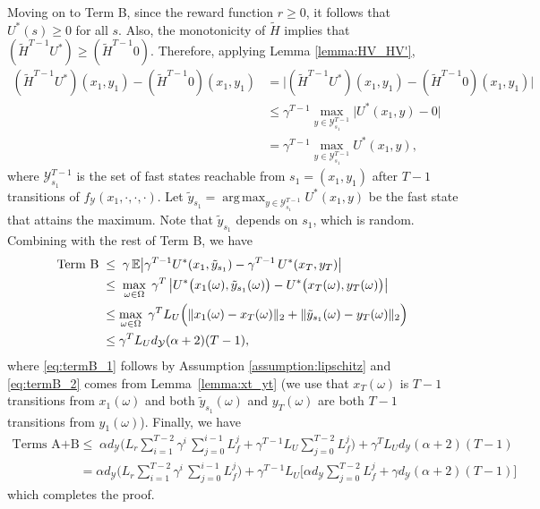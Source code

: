 \documentclass[11pt, notitlepage]{article}
\DeclareMathOperator*{\argmax}{arg\,max}
\newcommand{\E}{\mathbb{E}}
\newcommand{\1}{\mathbbm{1}}
\begin{document}
Moving on to Term B, since the reward function $r \ge 0$, it follows that $U^*(s) \ge 0$ for all $s$. Also, the monotonicity of $\tilde{H}$ implies that $(\tilde{H}^{T-1} U^*) \ge (\tilde{H}^{T-1} 0)$. Therefore, applying Lemma \ref{lemma:HV_HV'},
\begin{align*}
(\tilde{H}^{T-1} U^*)(x_1,y_1) - (\tilde{H}^{T-1} 0) (x_1,y_1) &= \bigl|(\tilde{H}^{T-1} U^*)(x_1,y_1) - (\tilde{H}^{T-1} 0) (x_1,y_1)\bigr|\\
&\le \gamma^{T-1} \textstyle \max_{y \in \mathcal Y_{s_1}^{T-1}} \bigl| U^*(x_1,y) - 0 \bigr| \\
&= \gamma^{T-1} \textstyle \max_{y \in \mathcal Y_{s_1}^{T-1}} U^*(x_1,y),
\end{align*}
where $\mathcal Y_{s_1}^{T-1}$ is the set of fast states reachable from $s_1=(x_1,y_1)$ after $T-1$ transitions of $f_\mathcal{Y}(x_1, \cdot, \cdot, \cdot)$. Let $\tilde{y}_{s_1} = \argmax_{y \in \mathcal Y_{s_1}^{T-1}} U^*(x_1,y)$ be the fast state that attains the maximum. Note that $\tilde{y}_{s_1}$ depends on $s_1$, which is random. Combining with the rest of Term B, we have
\begin{align}
\text{Term B} \; &\le \; \gamma \, \E  \bigl|\gamma^{T-1} U^*(x_1,\tilde{y}_{s_1}) - \gamma^{T-1} \, U^*(x_T,y_T)\bigr|\nonumber\\
&\le \; \max_{\omega \in \Omega} \; \gamma^T\, \bigl| U^*\bigl(x_1(\omega), \tilde{y}_{s_1}(\omega)\bigr) - U^*\bigl(x_T(\omega),y_T(\omega)\bigr) \bigr|\nonumber\\
&\le \max_{\omega \in \Omega} \; \gamma^T L_U \Bigl(\|x_1(\omega) - x_T(\omega)\|_2 + \|\tilde{y}_{s_1}(\omega) - y_T(\omega)\|_2\Bigr)\label{eq:termB_1}\\
&\le \gamma^T L_U d_\mathcal{Y} (\alpha + 2) (T-1),\label{eq:termB_2}
\end{align}
where \eqref{eq:termB_1} follows by Assumption \ref{assumption:lipschitz} and \eqref{eq:termB_2} comes from Lemma~\ref{lemma:xt_yt} (we use that $x_T(\omega)$ is $T-1$ transitions from $x_1(\omega)$ and both $\tilde{y}_{s_1}(\omega)$ and $y_T(\omega)$ are both $T-1$ transitions from $y_1(\omega)$). Finally, we have
\begin{align*}
\text{Terms A} + \text{B} \; &\le \; \alpha d_\mathcal{Y} \biggl( L_r \sum_{i=1}^{T-2} \gamma^i \, \sum_{j=0}^{i-1} L_f^j  + \gamma^{T-1} L_U \sum_{j=0}^{T-2} L_f^j \biggr) +  \gamma^T L_U d_\mathcal{Y} (\alpha + 2) (T-1)\\
&= \alpha d_\mathcal{Y} \biggl( L_r \sum_{i=1}^{T-2} \gamma^i \, \sum_{j=0}^{i-1} L_f^j \biggr) + \gamma^{T-1} L_U \Biggl[ \alpha d_\mathcal{Y} \sum_{j=0}^{T-2} L_f^j + \gamma d_\mathcal{Y} (\alpha + 2) (T-1)\Biggr]
\end{align*}
which completes the proof.
\end{document}
